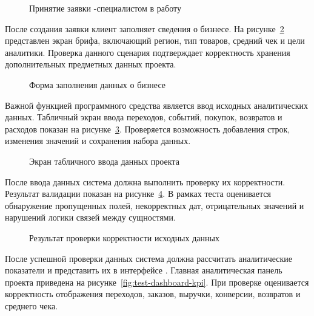 \begin{figure}[H]
    \centering
    \caption{Принятие заявки -специалистом в работу}
    \label{fig:test-seo-accept-application}
\end{figure}

После создания заявки клиент заполняет сведения о бизнесе. На рисунке~\ref{fig:test-business-profile-form} представлен экран брифа, включающий регион, тип товаров, средний чек и цели аналитики. Проверка данного сценария подтверждает корректность хранения дополнительных предметных данных проекта.

\begin{figure}[H]
    \centering
    \caption{Форма заполнения данных о бизнесе}
    \label{fig:test-business-profile-form}
\end{figure}

Важной функцией программного средства является ввод исходных аналитических данных. Табличный экран ввода переходов, событий, покупок, возвратов и расходов показан на рисунке~\ref{fig:test-project-data-input}. Проверяется возможность добавления строк, изменения значений и сохранения набора данных.

\begin{figure}[H]
    \centering
    \caption{Экран табличного ввода данных проекта}
    \label{fig:test-project-data-input}
\end{figure}

После ввода данных система должна выполнить проверку их корректности. Результат валидации показан на рисунке~\ref{fig:test-data-validation-result}. В рамках теста оценивается обнаружение пропущенных полей, некорректных дат, отрицательных значений и нарушений логики связей между сущностями.

\begin{figure}[H]
    \centering
    \caption{Результат проверки корректности исходных данных}
    \label{fig:test-data-validation-result}
\end{figure}

После успешной проверки данных система должна рассчитать аналитические показатели и представить их в интерфейсе . Главная аналитическая панель проекта приведена на рисунке~\ref{fig:test-dashboard-kpi}. При проверке оценивается корректность отображения переходов, заказов, выручки, конверсии, возвратов и среднего чека.

